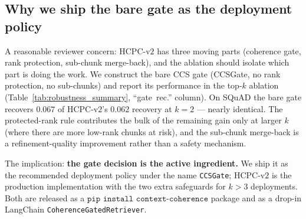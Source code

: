 \subsection{Why we ship the bare gate as the deployment policy}
\label{sec:method:why_bare}

A reasonable reviewer concern: HCPC-v$2$ has three moving parts
(coherence gate, rank protection, sub-chunk merge-back), and the
ablation should isolate which part is doing the work. We construct
the bare CCS gate (CCSGate, no rank protection, no sub-chunks) and
report its performance in the top-$k$ ablation
(Table~\ref{tab:robustness_summary}, ``gate~rec.'' column). On SQuAD the bare gate
recovers $0.067$ of HCPC-v$2$'s $0.062$ recovery at $k=2$ --- nearly
identical. The protected-rank rule contributes the bulk of the
remaining gain only at larger $k$ (where there are more low-rank
chunks at risk), and the sub-chunk merge-back is a refinement-quality
improvement rather than a safety mechanism.

The implication: \textbf{the gate decision is the active ingredient.}
We ship it as the recommended deployment policy under the name
\texttt{CCSGate}; HCPC-v$2$ is the production implementation with the
two extra safeguards for $k > 3$ deployments. Both are released as a
$\texttt{pip install context-coherence}$ package and as a drop-in
LangChain \texttt{CoherenceGatedRetriever}.
